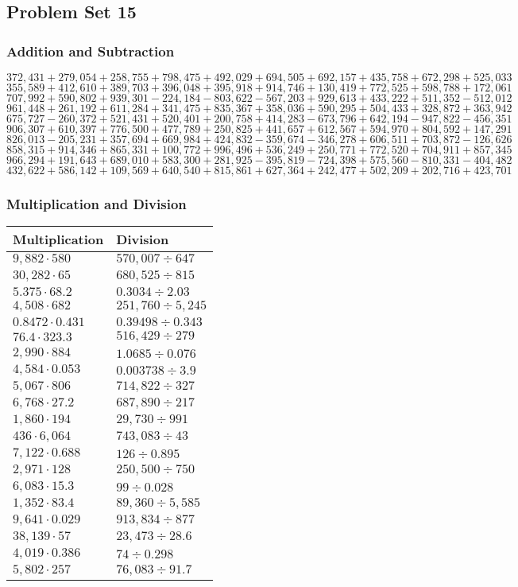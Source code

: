 \hypertarget{problem-set-15-5}{%
\subsection{Problem Set 15}\label{problem-set-15-5}}

\hypertarget{addition-and-subtraction-320}{%
\subsubsection{Addition and
Subtraction}\label{addition-and-subtraction-320}}

\(372,431+279,054+258,755+798,475+492,029+694,505+692,157+435,758+672,298+525,033\)
\(355,589+412,610+389,703+396,048+395,918+914,746+130,419+772,525+598,788+172,061\)
\(707,992+590,802+939,301-224,184-803,622-567,203+929,613+433,222+511,352-512,012\)
\(961,448+261,192+611,284+341,475+835,367+358,036+590,295+504,433+328,872+363,942\)
\(675,727-260,372+521,431+520,401+200,758+414,283-673,796+642,194-947,822-456,351\)
\(906,307+610,397+776,500+477,789+250,825+441,657+612,567+594,970+804,592+147,291\)
\(826,013-205,231+357,694+669,984+424,832-359,674-346,278+606,511+703,872-126,626\)
\(858,315+914,346+865,331+100,772+996,496+536,249+250,771+772,520+704,911+857,345\)
\(966,294+191,643+689,010+583,300+281,925-395,819-724,398+575,560-810,331-404,482\)
\(432,622+586,142+109,569+640,540+815,861+627,364+242,477+502,209+202,716+423,701\)

\hypertarget{multiplication-and-division-319}{%
\subsubsection{Multiplication and
Division}\label{multiplication-and-division-319}}

\begin{longtable}[]{@{}ll@{}}
\toprule
Multiplication & Division\tabularnewline
\midrule
\endhead
\(9,882\cdot580\) & \(570,007÷647\)\tabularnewline
\(30,282\cdot65\) & \(680,525÷815\)\tabularnewline
\(5.375\cdot68.2\) & \(0.3034÷2.03\)\tabularnewline
\(4,508\cdot682\) & \(251,760÷5,245\)\tabularnewline
\(0.8472\cdot0.431\) & \(0.39498÷0.343\)\tabularnewline
\(76.4\cdot323.3\) & \(516,429÷279\)\tabularnewline
\(2,990\cdot884\) & \(1.0685÷0.076\)\tabularnewline
\(4,584\cdot0.053\) & \(0.003738÷3.9\)\tabularnewline
\(5,067\cdot806\) & \(714,822÷327\)\tabularnewline
\(6,768\cdot27.2\) & \(687,890÷217\)\tabularnewline
\(1,860\cdot194\) & \(29,730÷991\)\tabularnewline
\(436\cdot6,064\) & \(743,083÷43\)\tabularnewline
\(7,122\cdot0.688\) & \(126÷0.895\)\tabularnewline
\(2,971\cdot128\) & \(250,500÷750\)\tabularnewline
\(6,083\cdot15.3\) & \(99÷0.028\)\tabularnewline
\(1,352\cdot83.4\) & \(89,360÷5,585\)\tabularnewline
\(9,641\cdot0.029\) & \(913,834÷877\)\tabularnewline
\(38,139\cdot57\) & \(23,473÷28.6\)\tabularnewline
\(4,019\cdot0.386\) & \(74÷0.298\)\tabularnewline
\(5,802\cdot257\) & \(76,083÷91.7\)\tabularnewline
\bottomrule
\end{longtable}

